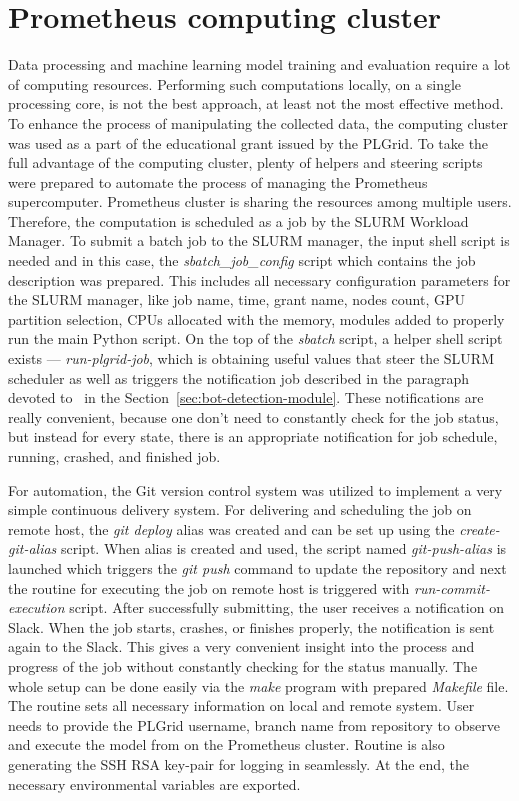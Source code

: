 \section{Prometheus computing cluster}\label{sec:prometheus-computing-cluster}
Data processing and machine learning model training and evaluation require a lot of computing resources.
Performing such computations locally, on a single processing core, is not the best approach, at least not the most effective method.
To enhance the process of manipulating the collected data, the computing cluster was used as a part of the educational grant issued by the PLGrid.
To take the full advantage of the computing cluster, plenty of helpers and steering scripts were prepared to automate the process of managing the Prometheus supercomputer.
Prometheus cluster is sharing the resources among multiple users.
Therefore, the computation is scheduled as a job by the SLURM Workload Manager.
To submit a batch job to the SLURM manager, the input shell script is needed and in this case, the \textit{sbatch\_job\_config} script which contains the job description was prepared.
This includes all necessary configuration parameters for the SLURM manager, like job name, time, grant name, nodes count, GPU partition selection, CPUs allocated with the memory, modules added to properly run the main Python script.
On the top of the \textit{sbatch} script, a helper shell script exists --- \textit{run-plgrid-job}, which is obtaining useful values that steer the SLURM scheduler as well as triggers the notification job described in the paragraph devoted to~ in the Section~\ref{sec:bot-detection-module}.
These notifications are really convenient, because one don't need to constantly check for the job status, but instead for every state, there is an appropriate notification for job schedule, running, crashed, and finished job.


For automation, the Git version control system was utilized to implement a very simple continuous delivery system.
For delivering and scheduling the job on remote host, the \textit{git deploy} alias was created and can be set up using the \textit{create-git-alias} script.
When alias is created and used, the script named \textit{git-push-alias} is launched which triggers the \textit{git push} command to update the repository and next the routine for executing the job on remote host is triggered with \textit{run-commit-execution} script.
After successfully submitting, the user receives a notification on Slack.
When the job starts, crashes, or finishes properly, the notification is sent again to the Slack.
This gives a very convenient insight into the process and progress of the job without constantly checking for the status manually.
The whole setup can be done easily via the \textit{make} program with prepared \textit{Makefile} file.
The routine sets all necessary information on local and remote system.
User needs to provide the PLGrid username, branch name from repository to observe and execute the model from on the Prometheus cluster.
Routine is also generating the SSH RSA key-pair for logging in seamlessly.
At the end, the necessary environmental variables are exported.
